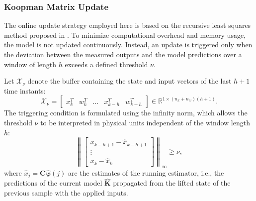 \subsubsection{Koopman Matrix Update}\label{subsec:koopmanOnlineUpdate}

The online update strategy employed here is based on the recursive least squares method proposed in \cite{cisneros2020data}. To minimize computational overhead and memory usage, the model is not updated continuously. Instead, an update is triggered only when the deviation between the measured outputs and the model predictions over a window of length $h$ exceeds a defined threshold $\nu$.

Let $\mathcal{X}_{\nu}$ denote the buffer containing the state and input vectors of the last $h+1$ time instants:
\[
\mathcal{X}_{\nu} = \begin{bmatrix} x_{k}^T & w_{k}^T & \dots & x_{k-h}^T & w_{k-h}^T \end{bmatrix} \in \mathbb{R}^{1 \times (n_x + n_w)(h+1)}.
\]
The triggering condition is formulated using the infinity norm, which allows the threshold $\nu$ to be interpreted in physical units independent of the window length $h$:
\begin{equation} \label{eq:add_data}
    \left\|
    \begin{bmatrix}
        x_{k-h+1} - \hat{x}_{k-h+1} \\
        \vdots \\
        x_{k} - \hat{x}_{k}
    \end{bmatrix}
    \right\|_\infty \geq \nu,
\end{equation}
where $\hat{x}_j = \bm{C}\hat{\bm{\varphi}}(j)$ are the estimates of the running estimator, i.e., the predictions of the current model $\hat{\bm{K}}$ propagated from the lifted state of the previous sample with the applied inputs.


